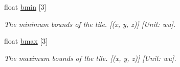 \begin{Indent}
\begin{DoxyCompactItemize}
\mbox{\label{structdtNavMeshCreateParams_a4fcb4e512932253e072fa4117d67273d}} 
float \hyperlink{structdtNavMeshCreateParams_a4fcb4e512932253e072fa4117d67273d}{bmin} \mbox{[}3\mbox{]}
\begin{DoxyCompactList}\small\item\em The minimum bounds of the tile. \mbox{[}(x, y, z)\mbox{]} \mbox{[}Unit\+: wu\mbox{]}. \end{DoxyCompactList}\item 
\mbox{\label{structdtNavMeshCreateParams_a7611d8a3e3c2b4f176337332e418a9ec}} 
float \hyperlink{structdtNavMeshCreateParams_a7611d8a3e3c2b4f176337332e418a9ec}{bmax} \mbox{[}3\mbox{]}
\begin{DoxyCompactList}\small\item\em The maximum bounds of the tile. \mbox{[}(x, y, z)\mbox{]} \mbox{[}Unit\+: wu\mbox{]}. \end{DoxyCompactList}\end{DoxyCompactItemize}
\end{Indent}
